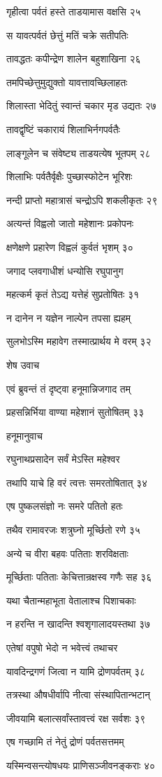 गृहीत्वा पर्वतं हस्ते ताडयामास वक्षसि २५

स यावत्पर्वतं छेत्तुं मतिं चक्रे सतीपतिः

तावद्धतः कपीन्द्रेण शालेन बहुशाखिना २६

तमपिच्छेत्तुमुद्युक्तो यावत्तावच्छिलाहतः

शिलास्ता भेदितुं स्वान्तं चकार मृड उद्यतः २७

तावद्वृष्टिं चकारायं शिलाभिर्नगपर्वतैः

लाङ्गूलेन च संवेष्ट्य ताडयत्येष भूतपम् २८

शिलाभिः पर्वतैर्वृक्षैः पुच्छास्फोटेन भूरिशः

नन्दी प्राप्तो महात्रासं चन्द्रोऽपि शकलीकृतः २९

अत्यन्तं विह्वलो जातो महेशानः प्रकोपनः

क्षणेक्षणे प्रहारेण विह्वलं कुर्वतं भृशम् ३०

जगाद प्लवगाधीशं धन्योसि रघुपानुग

महत्कर्म कृतं तेऽद्य यत्तेहं सुप्रतोषितः ३१

न दानेन न यज्ञेन नाल्पेन तपसा ह्यहम्

सुलभोऽस्मि महावेग तस्मात्प्रार्थय मे वरम् ३२

शेष उवाच

एवं ब्रुवन्तं तं दृष्ट्वा हनूमान्निजगाद तम्

प्रहसन्निर्भिया वाण्या महेशानं सुतोषितम् ३३

हनूमानुवाच

रघुनाथप्रसादेन सर्वं मेऽस्ति महेश्वर

तथापि याचे हि वरं त्वत्तः समरतोषितात् ३४

एष पुष्कलसंज्ञो नः समरे पतितो हतः

तथैव रामावरजः शत्रुघ्नो मूर्च्छितो रणे ३५

अन्ये च वीरा बहवः पतिताः शरविक्षताः

मूर्च्छिताः पतिताः केचित्तान्रक्षस्व गणैः सह ३६

यथा चैतान्महाभूता वेतालाश्च पिशाचकाः

न हरन्ति न खादन्ति श्वशृगालादयस्तथा ३७

एतेषां वपुषो भेदो न भवेत्त्वं तथाचर

यावदिन्द्रगणं जित्वा न यामि द्रोणपर्वतम् ३८

तत्रस्था औषधीर्वापि नीत्वा संस्थापितान्भटान्

जीवयामि बलात्सर्वांस्तावत्त्वं रक्ष सर्वशः ३९

एष गच्छामि तं नेतुं द्रोणं पर्वतसत्तमम्

यस्मिन्वसन्त्योषधयः प्राणिसञ्जीवनङ्कराः ४०

